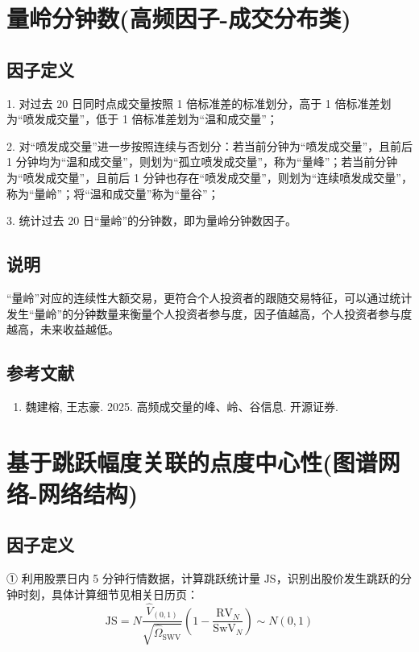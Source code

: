 \documentclass{article}
\begin{document}
\section{量岭分钟数(高频因子-成交分布类)}

\subsection{因子定义}

1. 对过去 20 日同时点成交量按照 1 倍标准差的标准划分，高于 1 倍标准差划为“喷发成交量”，低于 1 倍标准差划为“温和成交量”；

2. 对“喷发成交量”进一步按照连续与否划分：若当前分钟为“喷发成交量”，且前后 1 分钟均为“温和成交量”，则划为“孤立喷发成交量”，称为“量峰”；若当前分钟为“喷发成交量”，且前后 1 分钟也存在“喷发成交量”，则划为“连续喷发成交量”，称为“量岭”；将“温和成交量”称为“量谷”；

3. 统计过去 20 日“量岭”的分钟数，即为量岭分钟数因子。

\subsection{说明}
“量岭”对应的连续性大额交易，更符合个人投资者的跟随交易特征，可以通过统计发生“量岭”的分钟数量来衡量个人投资者参与度，因子值越高，个人投资者参与度越高，未来收益越低。

\subsection{参考文献}
\begin{enumerate}
    \item 魏建榕, 王志豪. 2025. 高频成交量的峰、岭、谷信息. 开源证券.
\end{enumerate}

\section{基于跳跃幅度关联的点度中心性(图谱网络-网络结构)}

\subsection{因子定义}


① 利用股票日内 5 分钟行情数据，计算跳跃统计量 \( \mathrm{JS} \)，识别出股价发生跳跃的分钟时刻，具体计算细节见相关日历页：
\begin{equation}
    \mathrm{JS} = N \frac{\hat{V}_{(0,1)}}{\sqrt{\hat{\Omega}_{\mathrm{SWV}}}} \left( 1 - \frac{\mathrm{RV}_N}{\mathrm{SwV}_N} \right) \sim N(0,1)
\end{equation}
\end{document}
